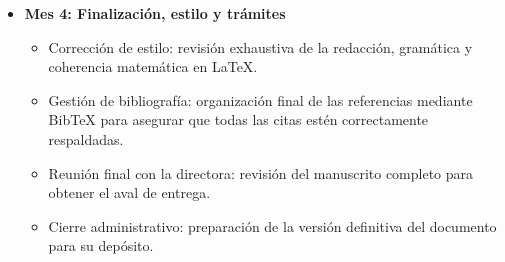 \documentclass{article}
\begin{document}
\begin{itemize}
\begin{itemize}
             \item \textbf{Mes 4: Finalización, estilo y trámites}
                \begin{itemize}
                   \item Corrección de estilo: revisión exhaustiva de la redacción, gramática y coherencia matemática en \LaTeX .
                   \item Gestión de bibliografía: organización final de las referencias mediante BibTeX para asegurar que todas las citas estén correctamente respaldadas.
                   \item Reunión final con la directora: revisión del manuscrito completo para obtener el aval de entrega.
                   \item Cierre administrativo: preparación de la versión definitiva del documento para su depósito.
                \end{itemize}
          \end{itemize}
    \end{itemize}

    \nocite{*}
    
    
\end{document}
